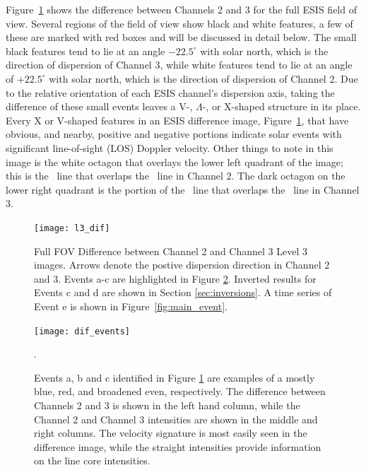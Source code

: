     	Figure~\ref{fig:l3_dif} shows the difference between Channels 2 and 3 for the full ESIS field of view.  
    	Several regions of the field of view show black and white features, a few of these are marked with red boxes and will be discussed in detail below.  
    	The small black features tend to lie at an angle $-22.5^\circ$ with solar north, which is the direction of dispersion of Channel 3, while white features tend to lie at an angle of $+22.5^\circ$ with solar north, which is the direction of dispersion of Channel 2.  
    	Due to the relative orientation of each ESIS channel's dispersion axis, taking the difference of these small events leaves a V-, $\Lambda$-, or X-shaped structure in its place.  
    	Every X or V-shaped features in an ESIS difference image, Figure~\ref{fig:l3_dif}, that have obvious, and nearby, positive and negative portions indicate solar events with significant line-of-sight (LOS) Doppler velocity.   
    	Other things to note in this image is the white octagon that overlays the lower left quadrant of the image; this is the \mgxbright \ line that overlaps the \ov \ line in Channel 2.  The dark octagon on the lower right quadrant is the portion of the \mgxbright \ line that overlaps the \ov \ line in Channel 3.    
   		
   		\begin{figure}[htb!]
   			\centering
   			\texttt{[image: l3\_dif]}
   			\caption{Full FOV Difference between Channel 2 and Channel 3 Level 3 images.  
   			Arrows denote the postive dispersion direction in Channel 2 and 3.
   			Events a-c are highlighted in Figure \ref{fig:dif_events}.    
   			Inverted results for Events c and d are shown in Section \ref{sec:inversions}. 
   			A time series of Event e is shown in Figure~\ref{fig:main_event}.}
   			\label{fig:l3_dif}
   		\end{figure}
   	
   	
 		\begin{figure}[htb!]
   			\centering
   			\texttt{[image: dif\_events]}
   			\caption{Events a, b and c identified in Figure \ref{fig:l3_dif} are examples of a mostly blue, red, and broadened even, respectively. The difference between Channels 2 and 3 is shown in the left hand column, while the Channel 2 and Channel 3 intensities are shown in the middle and right columns.  The velocity signature is most easily seen in the difference image, while the straight intensities provide information on the line core intensities. 
   			}
   			\label{fig:dif_events}. 
   		\end{figure}

